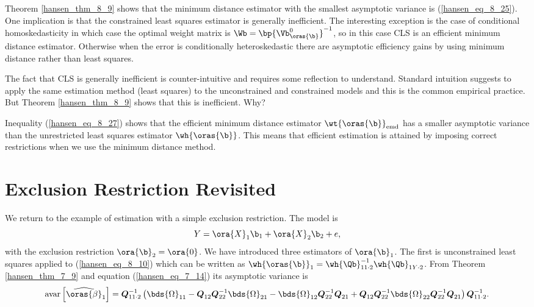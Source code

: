 Theorem \ref{hansen_thm_8_9} shows that the minimum distance estimator with the smallest asymptotic variance is (\ref{hansen_eq_8_25}). One implication is that the constrained least squares estimator is generally inefficient. The interesting exception is the case of conditional homoskedasticity in which case the optimal weight matrix is $\Wb = \bp{\Vb_{\oras{\b}}^0}^{-1}$, so in this case CLS is an efficient minimum distance estimator. Otherwise when the error is conditionally heteroskedastic there are asymptotic efficiency gains by using minimum distance rather than least squares.

The fact that CLS is generally inefficient is counter-intuitive and requires some reflection to understand. Standard intuition suggests to apply the same estimation method (least squares) to the unconstrained and constrained models and this is the common empirical practice. But Theorem \ref{hansen_thm_8_9} shows that this is inefficient. Why? 

Inequality (\ref{hansen_eq_8_27}) shows that the efficient minimum distance estimator $\wt{\oras{\b}}_{\text{emd}}$ has a smaller asymptotic variance than the unrestricted least squares estimator $\wh{\oras{\b}}$. This means that efficient estimation is attained by imposing correct restrictions when we use the minimum distance method.

\section{Exclusion Restriction Revisited}

We return to the example of estimation with a simple exclusion restriction. The model is 
\begin{equation}
    \notag 
    Y = \ora{X}_1 \b_1 + \ora{X}_2 \b_2 + e,
\end{equation}
with the exclusion restriction $\ora{\b}_2 = \ora{0}$. We have introduced three estimators of $\ora{\b}_1$. The first is unconstrained least squares applied to (\ref{hansen_eq_8_10}) which can be written as $\wh{\oras{\b}}_1 = \wh{\Qb}_{11 \cdot 2}^{-1} \wh{\Qb}_{1 Y \cdot 2}$. From Theorem \ref{hansen_thm_7_9} and equation (\ref{hansen_eq_7_14}) its asymptotic variance is 
\begin{equation}
    \notag 
    \operatorname{avar}\left[\widehat{\oras{\beta}}_1\right]=\boldsymbol{Q}_{11 \cdot 2}^{-1}\left(\bds{\Omega}_{11}-\boldsymbol{Q}_{12} \boldsymbol{Q}_{22}^{-1} \bds{\Omega}_{21}-\bds{\Omega}_{12} \boldsymbol{Q}_{22}^{-1} \boldsymbol{Q}_{21}+\boldsymbol{Q}_{12} \boldsymbol{Q}_{22}^{-1} \bds{\Omega}_{22} \boldsymbol{Q}_{22}^{-1} \boldsymbol{Q}_{21}\right) \boldsymbol{Q}_{11 \cdot 2}^{-1} .
\end{equation}

